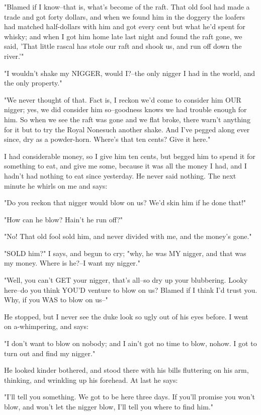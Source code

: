 "Blamed if I know--that is, what's become of the raft.  That old fool had
made a trade and got forty dollars, and when we found him in the doggery
the loafers had matched half-dollars with him and got every cent but what
he'd spent for whisky; and when I got him home late last night and found
the raft gone, we said, 'That little rascal has stole our raft and shook
us, and run off down the river.'"

"I wouldn't shake my NIGGER, would I?--the only nigger I had in the
world, and the only property."

"We never thought of that.  Fact is, I reckon we'd come to consider him
OUR nigger; yes, we did consider him so--goodness knows we had trouble
enough for him.  So when we see the raft was gone and we flat broke,
there warn't anything for it but to try the Royal Nonesuch another shake.
And I've pegged along ever since, dry as a powder-horn.  Where's that ten
cents? Give it here."

I had considerable money, so I give him ten cents, but begged him to
spend it for something to eat, and give me some, because it was all the
money I had, and I hadn't had nothing to eat since yesterday.  He never
said nothing.  The next minute he whirls on me and says:

"Do you reckon that nigger would blow on us?  We'd skin him if he done
that!"

"How can he blow?  Hain't he run off?"

"No!  That old fool sold him, and never divided with me, and the money's
gone."

"SOLD him?"  I says, and begun to cry; "why, he was MY nigger, and that
was my money.  Where is he?--I want my nigger."

"Well, you can't GET your nigger, that's all--so dry up your blubbering.
Looky here--do you think YOU'D venture to blow on us?  Blamed if I think
I'd trust you.  Why, if you WAS to blow on us--"

He stopped, but I never see the duke look so ugly out of his eyes before.
I went on a-whimpering, and says:

"I don't want to blow on nobody; and I ain't got no time to blow, nohow.
I got to turn out and find my nigger."

He looked kinder bothered, and stood there with his bills fluttering on
his arm, thinking, and wrinkling up his forehead.  At last he says:

"I'll tell you something.  We got to be here three days.  If you'll
promise you won't blow, and won't let the nigger blow, I'll tell you
where to find him."

